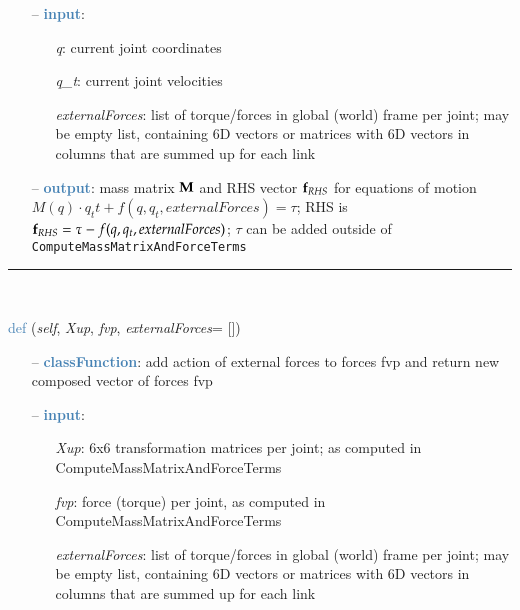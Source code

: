 \begin{itemize}[leftmargin=1.4cm]
\begin{itemize}[leftmargin=0.5cm]
\begin{itemize}[leftmargin=1.4cm]
\begin{itemize}[leftmargin=0.5cm]
\begin{itemize}[leftmargin=1.4cm]
\begin{itemize}[leftmargin=0.5cm]
\begin{itemize}[leftmargin=1.4cm]
\begin{itemize}[leftmargin=1.4cm]
\begin{itemize}[leftmargin=1.4cm]
\begin{itemize}[leftmargin=0.7cm]
\begin{itemize}[leftmargin=1.2cm]
  \end{itemize}
  \item[--]  \textcolor{steelblue}{\bf input}: \vspace{-6pt}
  \begin{itemize}[leftmargin=1.2cm]
\setlength{\itemindent}{-0.7cm}
    \item[] {\it q}: current joint coordinates
    \item[] {\it   q\_t}: current joint velocities
    \item[] {\it   externalForces}: list of torque/forces in global (world) frame per joint; may be empty list, containing 6D vectors or matrices with 6D vectors in columns that are summed up for each link
  \end{itemize}
  \item[--]  \textcolor{steelblue}{\bf output}: mass matrix $\mathbf{M}$ and RHS vector $\mathbf{f}_{RHS}$ for equations of motion $M(q) \cdot q_tt + f(q,q_t,externalForces) = \tau$; RHS is $\mathbf{f}_{RHS}=\tau - f(q,q_t,externalForces)$; $\tau$ can be added outside of \texttt{ComputeMassMatrixAndForceTerms}\vspace{12pt}\end{itemize}
%
\noindent\rule{8cm}{0.75pt}\vspace{1pt} \\ 
\begin{flushleft}
\noindent \textcolor{steelblue}{def {\bf {}}}\label{sec:kinematicTree:KinematicTree66:AddExternalForces}
({\it self}, {\it Xup}, {\it fvp}, {\it externalForces}= [])
\end{flushleft}
\setlength{\itemindent}{0.7cm}
\begin{itemize}[leftmargin=0.7cm]
  \item[--]  \textcolor{steelblue}{\bf classFunction}: add action of external forces to forces fvp and return new composed vector of forces fvp  \item[--]  \textcolor{steelblue}{\bf input}: \vspace{-6pt}
  \begin{itemize}[leftmargin=1.2cm]
\setlength{\itemindent}{-0.7cm}
    \item[] {\it Xup}: 6x6 transformation matrices per joint; as computed in ComputeMassMatrixAndForceTerms
    \item[] {\it   fvp}: force (torque) per joint, as computed in ComputeMassMatrixAndForceTerms
    \item[] {\it   externalForces}: list of torque/forces in global (world) frame per joint; may be empty list, containing 6D vectors or matrices with 6D vectors in columns that are summed up for each link

\end{itemize}
\end{itemize}
\end{itemize}
\end{itemize}
\end{itemize}
\end{itemize}
\end{itemize}
\end{itemize}
\end{itemize}
\end{itemize}
\end{itemize}
